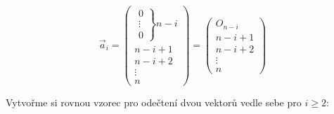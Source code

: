 \documentclass[12pt]{article}
\begin{document}
\begin{enumerate}
\begin{enumerate}
        \[
          \vec{a}_i = 
          \left(
            \begin{array}{c}
              \left.\begin{array}{c}
              0 \\ 
              \vdots \\ 
              0
              \end{array}\right\} \! n-i \\
              n-i+1 \\ n-i+2 \\ \vdots \\ n
            \end{array}
          \right)=
          \left(\begin{array}{c} 
            O_{n-i} \\ \hline n-i+1 \\ n-i+2 \\ \vdots \\ n
          \end{array}\right)
        \]

        Vytvořme si rovnou vzorec pro odečtení dvou vektorů vedle sebe pro $i \geq 2$:


\end{enumerate}
\end{enumerate}
\end{document}
